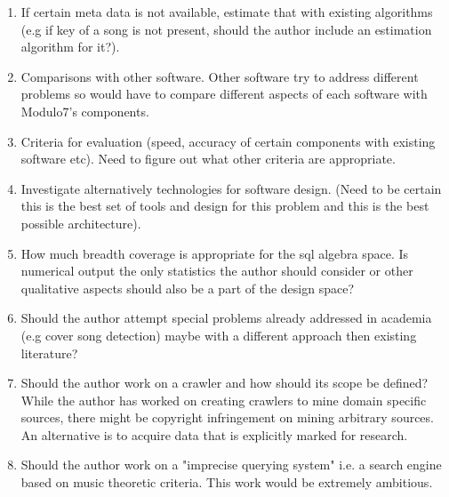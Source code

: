 \begin{enumerate}
\item If certain meta data is not available, estimate that with existing algorithms (e.g if key of a song is not present, should the author include an estimation algorithm for it?).
\item Comparisons with other software. Other software try to address different problems so would have to compare different aspects of each software with Modulo7's components.
\item Criteria for evaluation (speed, accuracy of certain components with existing software etc). Need to figure out what other criteria are appropriate.
\item Investigate alternatively technologies for software design. (Need to be certain this is the best set of tools and design for this problem and this is the best possible architecture). 
\item How much breadth coverage is appropriate for the sql algebra space. Is numerical output the only statistics the author should consider or other qualitative aspects should also be a part of the design space?
\item Should the author attempt special problems already addressed in academia (e.g cover song detection) maybe with a different approach then existing literature?
\item Should the author work on a crawler and how should its scope be defined? While the author has worked on creating crawlers to mine domain specific sources, there might be copyright infringement on mining arbitrary sources. An alternative is to acquire data that is explicitly marked for research.
\item Should the author work on a "imprecise querying system" i.e. a search engine based on music theoretic criteria. This work would be extremely ambitious. 
\end{enumerate}